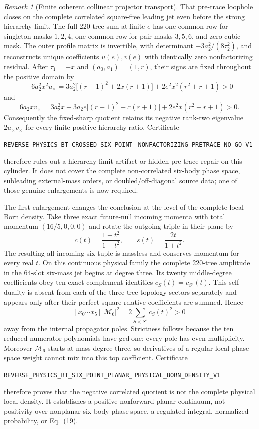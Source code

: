 \documentclass[11pt]{article}
\theoremstyle{definition}
\theoremstyle{remark}
\newtheorem{remark}[theorem]{Remark}
\begin{document}
\begin{remark}[Finite coherent collinear projector transport]
That pre-trace loophole closes on the complete correlated square-free leading
jet even before the strong hierarchy limit.  The full 220-tree sum at finite
$e$ has one common row for singleton masks $1,2,4$, one common row for pair
masks $3,5,6$, and zero cubic mask.  The outer profile matrix is invertible,
with determinant $-3a_2^2/(8\tau_2^2)$, and reconstructs unique coefficients
$u(e),v(e)$ with identically zero nonfactorizing residual.  After
$\tau_1=-x$ and $(a_0,a_1)=(1,r)$, their signs are fixed throughout the
positive domain by
\[
 -6a_2^2x^2u_\times=
 3a_2^2\bigl[(r-1)^2+2x(r+1)\bigr]
 +2e^2x^2(r^2+r+1)>0
\]
and
\[
 6a_2xv_\times=3a_2^2x
 +3a_2e\bigl[(r-1)^2+x(r+1)\bigr]
 +2e^2x(r^2+r+1)>0.
\]
Consequently the fixed-sharp quotient retains its negative rank-two
eigenvalue $2u_\times v_\times$ for every finite positive hierarchy ratio.
Certificate
\par\noindent
\texttt{REVERSE\_PHYSICS\_BT\_CROSSED\_SIX\_POINT\_}
\allowbreak\texttt{NONFACTORIZING\_PRETRACE\_NO\_GO\_V1}
\par\noindent
therefore rules out a hierarchy-limit artifact or hidden pre-trace repair on
this cylinder.  It does not cover the complete non-correlated six-body phase
space, subleading external-mass orders, or doubled/off-diagonal source data;
one of those genuine enlargements is now required.

The first enlargement changes the conclusion at the level of the complete
local Born density.  Take three exact future-null incoming momenta with total
momentum $(16/5,0,0,0)$ and rotate the outgoing triple in their plane by
\[
 c(t)=\frac{1-t^2}{1+t^2},\qquad s(t)=\frac{2t}{1+t^2}.
\]
The resulting all-incoming six-tuple is massless and conserves momentum for
every real $t$.  On this continuous physical family the complete 220-tree
amplitude in the 64-slot six-mass jet begins at degree three.  Its twenty
middle-degree coefficients obey ten exact complement identities
$c_S(t)=c_{S^c}(t)$.  This self-duality is absent from each of the three tree
topology sectors separately and appears only after their perfect-square
relative coefficients are summed.  Hence
\[
 [x_0\cdots x_5]|\mathcal M_6|^2
 =2\sum_{S<S^c}c_S(t)^2>0
\]
away from the internal propagator poles.  Strictness follows because the ten
reduced numerator polynomials have gcd one; every pole has even multiplicity.
Moreover $\mathcal M_6$ starts at mass degree three, so derivatives of a
regular local phase-space weight cannot mix into this top coefficient.
Certificate
\par\noindent
\texttt{REVERSE\_PHYSICS\_BT\_SIX\_POINT\_PLANAR\_}
\allowbreak\texttt{PHYSICAL\_BORN\_DENSITY\_V1}
\par\noindent
therefore proves that the negative correlated quotient is not the complete
physical local density.  It establishes a positive nonforward planar
continuum, not positivity over nonplanar six-body phase space, a regulated
integral, normalized probability, or Eq.~(19).


\end{remark}
\end{document}
